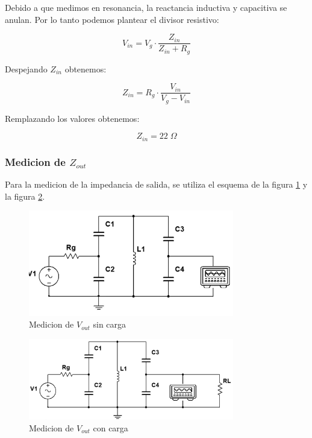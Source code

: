 Debido a que medimos en resonancia, la reactancia inductiva y capacitiva se anulan. Por lo tanto podemos plantear el divisor resistivo:

\begin{equation}
    V_{in} = V_g \cdot \frac{Z_{in}}{Z_{in} + R_{g}}
\end{equation}

Despejando $Z_{in}$ obtenemos:

\begin{equation}
    Z_{in} = R_g \cdot \frac{ V_{in}}{V_g - V_{in}}
\end{equation}

Remplazando los valores obtenemos:

\begin{equation}
    Z_{in} = 22\; \Omega
\end{equation}

\subsubsection{Medicion de $Z_{out}$}

Para la medicion de la impedancia de salida, se utiliza el esquema de la figura \ref{fig: Primer esquema de la medicion de la impedancia de salida} y la figura
\ref{fig: Segundo esquema de la medicion de la impedancia de salida}.

%
\begin{figure}[h]
    \centering
    \includegraphics[width=0.8\textwidth]{Imagenes/medicion_zout1.png}
    \caption{Medicion de $V_{out}$ sin carga}
    \label{fig: Primer esquema de la medicion de la impedancia de salida}
\end{figure}

% 
\begin{figure}[h]
    \centering
    \includegraphics[width=0.8\textwidth]{Imagenes/medicion_zout2.png}
    \caption{Medicion de $V_{out}$ con carga}
    \label{fig: Segundo esquema de la medicion de la impedancia de salida}
\end{figure}




